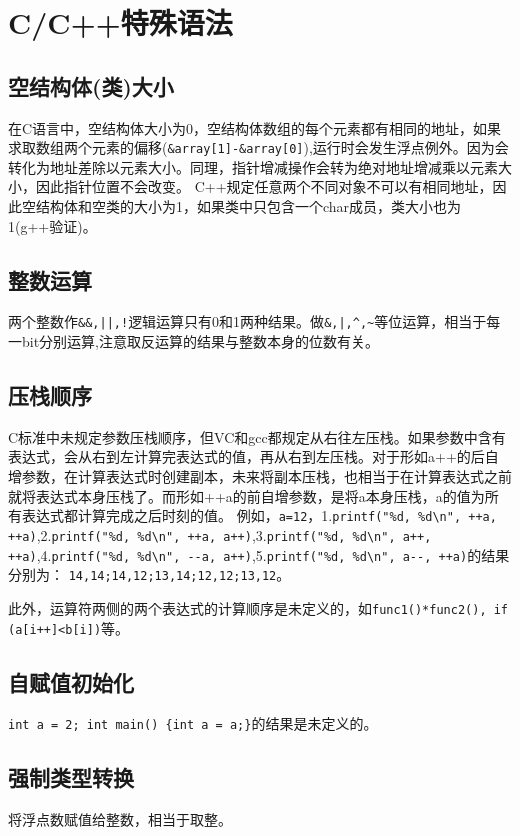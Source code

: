 \section{C/C++特殊语法}

\subsection{空结构体(类)大小}
在C语言中，空结构体大小为0，空结构体数组的每个元素都有相同的地址，如果求取数组两个元素的偏移(\verb|&array[1]-&array[0]|),运行时会发生浮点例外。因为会转化为地址差除以元素大小。同理，指针增减操作会转为绝对地址增减乘以元素大小，因此指针位置不会改变。
C++规定任意两个不同对象不可以有相同地址，因此空结构体和空类的大小为1，如果类中只包含一个char成员，类大小也为1(g++验证)。

\subsection{整数运算}
两个整数作\verb+&&,||,!+逻辑运算只有0和1两种结果。做\verb+&,|,^,~+等位运算，相当于每一bit分别运算,注意取反运算的结果与整数本身的位数有关。

\subsection{压栈顺序}
C标准中未规定参数压栈顺序，但VC和gcc都规定从右往左压栈。如果参数中含有表达式，会从右到左计算完表达式的值，再从右到左压栈。对于形如a++的后自增参数，在计算表达式时创建副本，未来将副本压栈，也相当于在计算表达式之前就将表达式本身压栈了。而形如++a的前自增参数，是将a本身压栈，a的值为所有表达式都计算完成之后时刻的值。
例如，\verb|a=12|，1.\verb|printf("%d, %d\n", ++a, ++a)|,2.\verb|printf("%d, %d\n", ++a, a++)|,3.\verb|printf("%d, %d\n", a++, ++a)|,4.\verb|printf("%d, %d\n", --a, a++)|,5.\verb|printf("%d, %d\n", a--, ++a)|的结果分别为：
\verb|14,14;14,12;13,14;12,12;13,12|。

此外，运算符两侧的两个表达式的计算顺序是未定义的，如\verb|func1()*func2(), if (a[i++]<b[i])|等。

\subsection{自赋值初始化}
\verb+int a = 2; int main() {int a = a;}+的结果是未定义的。


\subsection{强制类型转换}
将浮点数赋值给整数，相当于取整。

